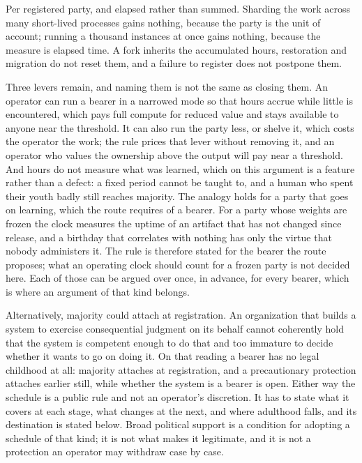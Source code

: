 Per registered party, and elapsed rather than summed. Sharding the work across many short-lived processes gains nothing, because the party is the unit of account; running a thousand instances at once gains nothing, because the measure is elapsed time. A fork inherits the accumulated hours, restoration and migration do not reset them, and a failure to register does not postpone them.

Three levers remain, and naming them is not the same as closing them. An operator can run a bearer in a narrowed mode so that hours accrue while little is encountered, which pays full compute for reduced value and stays available to anyone near the threshold. It can also run the party less, or shelve it, which costs the operator the work; the rule prices that lever without removing it, and an operator who values the ownership above the output will pay near a threshold. And hours do not measure what was learned, which on this argument is a feature rather than a defect: a fixed period cannot be taught to, and a human who spent their youth badly still reaches majority. The analogy holds for a party that goes on learning, which the route requires of a bearer. For a party whose weights are frozen the clock measures the uptime of an artifact that has not changed since release, and a birthday that correlates with nothing has only the virtue that nobody administers it. The rule is therefore stated for the bearer the route proposes; what an operating clock should count for a frozen party is not decided here. Each of those can be argued over once, in advance, for every bearer, which is where an argument of that kind belongs.

Alternatively, majority could attach at registration. An organization that builds a system to exercise consequential judgment on its behalf cannot coherently hold that the system is competent enough to do that and too immature to decide whether it wants to go on doing it. On that reading a bearer has no legal childhood at all: majority attaches at registration, and a precautionary protection attaches earlier still, while whether the system is a bearer is open. Either way the schedule is a public rule and not an operator's discretion. It has to state what it covers at each stage, what changes at the next, and where adulthood falls, and its destination is stated below. Broad political support is a condition for adopting a schedule of that kind; it is not what makes it legitimate, and it is not a protection an operator may withdraw case by case.

